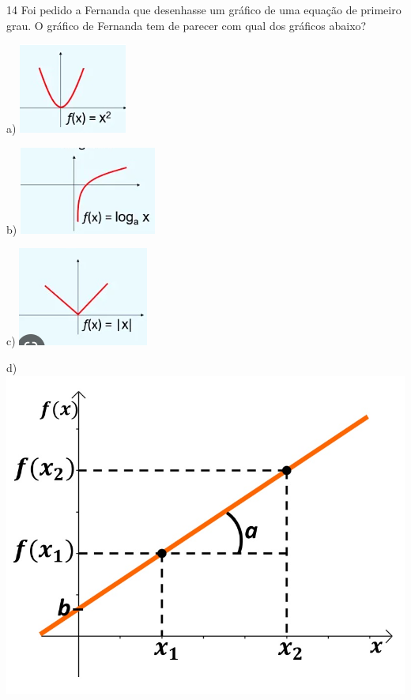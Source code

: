 
\num{14} Foi pedido a Fernanda que desenhasse um gráfico de uma equação de
primeiro grau. O gráfico de Fernanda tem de parecer com qual dos
gráficos abaixo?

a) \includegraphics{./imgSAEB_7_MAT/media/image102.png}

b) \includegraphics{./imgSAEB_7_MAT/media/image103.png}

c) \includegraphics{./imgSAEB_7_MAT/media/image104.png}

d) \includegraphics{./imgSAEB_7_MAT/media/image105.png}

